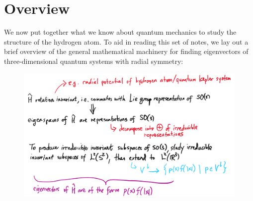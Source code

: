 \section{Overview}
We now put together what we know about quantum mechanics to study the structure of the hydrogen atom. To aid in reading this set of notes, we lay out a brief overview of the general mathematical machinery for finding eigenvectors of three-dimensional quantum systems with radial symmetry:
\begin{figure}[ht]
    \includegraphics[width=\textwidth]{figures/quantum_kepler}
    \centering
\end{figure}
